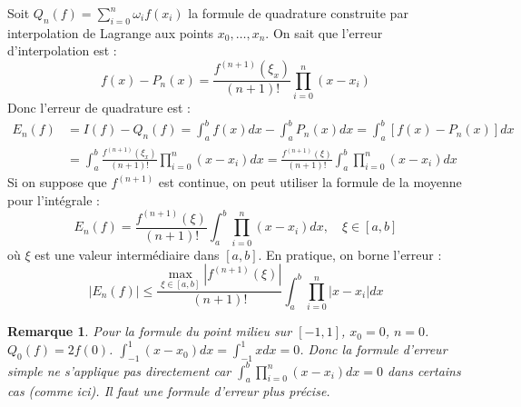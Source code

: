 \documentclass{article}
\newtheorem{remark}{Remarque}
\begin{document}
Soit $Q_n(f) = \sum_{i=0}^{n} \omega_i f(x_i)$ la formule de quadrature construite par interpolation de Lagrange aux points $x_0, \dots, x_n$.
On sait que l'erreur d'interpolation est :
\[
f(x) - P_n(x) = \frac{f^{(n+1)}(\xi_x)}{(n+1)!} \prod_{i=0}^{n} (x - x_i)
\]
Donc l'erreur de quadrature est :
\begin{align*}
E_n(f) &= I(f) - Q_n(f) = \int_{a}^{b} f(x) dx - \int_{a}^{b} P_n(x) dx = \int_{a}^{b} [f(x) - P_n(x)] dx \\
&= \int_{a}^{b} \frac{f^{(n+1)}(\xi_x)}{(n+1)!} \prod_{i=0}^{n} (x - x_i) dx = \frac{f^{(n+1)}(\xi)}{(n+1)!} \int_{a}^{b} \prod_{i=0}^{n} (x - x_i) dx
\end{align*}
Si on suppose que $f^{(n+1)}$ est continue, on peut utiliser la formule de la moyenne pour l'intégrale :
\[
E_n(f) = \frac{f^{(n+1)}(\xi)}{(n+1)!} \int_{a}^{b} \prod_{i=0}^{n} (x - x_i) dx, \quad \xi \in [a, b]
\]
où $\xi$ est une valeur intermédiaire dans $[a, b]$. En pratique, on borne l'erreur :
\[
|E_n(f)| \leq \frac{\max_{\xi \in [a, b]} |f^{(n+1)}(\xi)|}{(n+1)!} \int_{a}^{b} \prod_{i=0}^{n} |x - x_i| dx
\]

\begin{remark}
Pour la formule du point milieu sur $[-1, 1]$, $x_0 = 0$, $n = 0$.
$Q_0(f) = 2f(0)$. $\int_{-1}^{1} (x - x_0) dx = \int_{-1}^{1} x dx = 0$.
Donc la formule d'erreur simple ne s'applique pas directement car $\int_{a}^{b} \prod_{i=0}^{n} (x - x_i) dx = 0$ dans certains cas (comme ici).
Il faut une formule d'erreur plus précise.
\end{remark}
\end{document}
